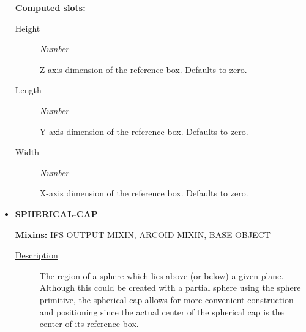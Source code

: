 \documentclass [11pt]{book}
\begin{document}
\begin{itemize}
\textbf{
\underline{Computed slots:}}

\begin{description}

\item [Height]
\emph{Number}

 Z-axis dimension of the reference box. Defaults to zero.




\item [Length]
\emph{Number}

 Y-axis dimension of the reference box. Defaults to zero.




\item [Width]
\emph{Number}

 X-axis dimension of the reference box. Defaults to zero.




\end{description}







\item {}
\textbf{SPHERICAL-CAP}


\textbf{
\underline{Mixins:}} IFS-OUTPUT-MIXIN, ARCOID-MIXIN, BASE-OBJECT





\begin{description}

\item [
\underline{Description}]


The region of a sphere which lies above (or below) a given plane. Although this
could be created with a partial sphere using the sphere primitive, the spherical cap allows for more convenient
construction and positioning since the actual center of the spherical cap is the center of its reference box.



\end{description}




\begin{figure}
\begin{lrbox}{\boxedverb}
\begin{minipage}{\linewidth}
{\small

\begin{verbatim}
  

\end{verbatim}}
\end{minipage}
\end{lrbox}
\end{figure}
\end{itemize}
\end{document}
